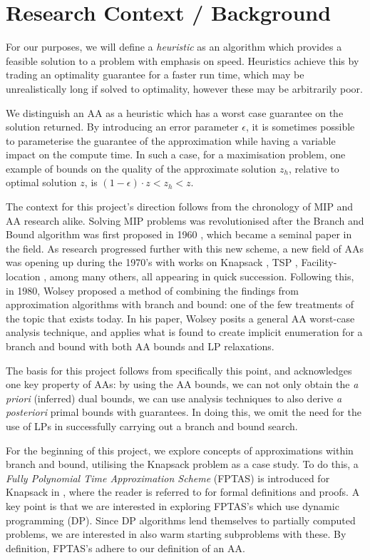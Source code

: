 \documentclass[12pt, a4paper]{article}
\begin{document}
\section{Research Context / Background}

For our purposes, we will define a \textit{heuristic} as an algorithm which provides a feasible solution to a problem with emphasis on speed. Heuristics achieve this by trading an optimality guarantee for a faster run time, which may be unrealistically long if solved to optimality, however these may be arbitrarily poor.

We distinguish an AA as a heuristic which has a worst case guarantee on the solution returned. By introducing an error parameter $\epsilon$, it is sometimes possible to parameterise the guarantee of the approximation while having a variable impact on the compute time. In such a case, for a maximisation problem, one example of bounds on the quality of the approximate solution $z_h$, relative to optimal solution $z$, is $(1-\epsilon)\cdot z < z_h < z$.   

The context for this project's direction follows from the chronology of MIP and AA research alike. Solving MIP problems was revolutionised after the Branch and Bound algorithm was first proposed in 1960 \cite{LandDoig}, which became a seminal paper in the field. As research progressed further with this new scheme, a new field of AAs was opening up during the 1970's with works on Knapsack \cite{IbarraKim}, TSP \cite{CristofidesTSP}, Facility-location \cite{CornuejolsFisherNemhauser}, among many others, all appearing in quick succession. Following this, in 1980, Wolsey \cite{WOLSEY} proposed a method of combining the findings from approximation algorithms with branch and bound: one of the few treatments of the topic that exists today. In his paper, Wolsey posits a general AA worst-case analysis technique, and applies what is found to create implicit enumeration for a branch and bound with both AA bounds and LP relaxations. 

The basis for this project follows from specifically this point, and acknowledges one key property of AAs: by using the AA bounds, we can not only obtain the \textit{a priori} (inferred) dual bounds, we can use analysis techniques to also derive \textit{a posteriori} primal bounds with guarantees. In doing this, we omit the need for the use of LPs in successfully carrying out a branch and bound search.

For the beginning of this project, we explore concepts of approximations within branch and bound, utilising the Knapsack problem as a case study. To do this, a \textit{Fully Polynomial Time Approximation Scheme} (FPTAS) is introduced for Knapsack in \cite{BOOK:2}, where the reader is referred to for formal definitions and proofs. A key point is that we are interested in exploring FPTAS's which use dynamic programming (DP). Since DP algorithms lend themselves to partially computed problems, we are interested in also warm starting subproblems with these. By definition, FPTAS's adhere to our definition of an AA.
\end{document}
